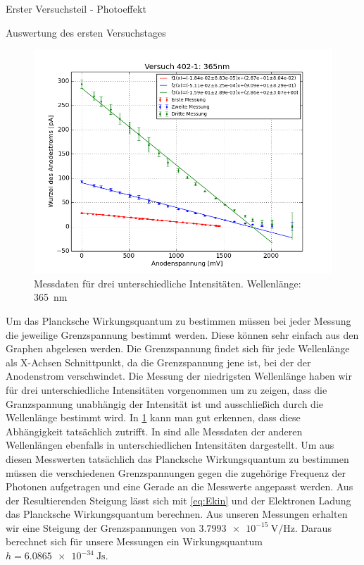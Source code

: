 \documentclass[pdftex, a4paper,11pt, twoside, ngerman]{report}
\begin{document}
\begin{chapter}{Erster Versuchsteil - Photoeffekt}
    \begin{section}{Auswertung des ersten Versuchstages}
      \label{chp:Photoeffekt:sec:Auswertung}
      \begin{figure}[b!]
        \begin{center}
          \includegraphics[width=\textwidth]{Figures/Versuch402_1_365.png}
          \caption{Messdaten für drei unterschiedliche Intensitäten. Wellenlänge: \SI{365}{\nano\meter}}\label{fig:Versuch402_1_365}
        \end{center}
      \end{figure}
      Um das Plancksche Wirkungsquantum zu bestimmen müssen bei jeder Messung die jeweilige Grenzspannung bestimmt werden. Diese können sehr einfach aus den Graphen abgelesen werden. Die Grenzspannung findet sich für jede Wellenlänge als X-Achsen Schnittpunkt, da die Grenzspannung jene ist, bei der der Anodenstrom verschwindet. Die Messung der niedrigsten Wellenlänge haben wir für drei unterschiedliche Intensitäten vorgenommen um zu zeigen, dass die Granzspannung unabhängig der Intensität ist und ausschließich durch die Wellenlänge bestimmt wird. In \cref{fig:Versuch402_1_365} kann man gut erkennen, dass diese Abhängigkeit tatsächlich zutrifft. In  sind alle Messdaten der anderen Wellenlängen ebenfalls in unterschiedlichen Intensitäten dargestellt. Um aus diesen Messwerten tatsächlich das Plancksche Wirkungsquantum zu bestimmen müssen die verschiedenen Grenzspannungen gegen die zugehörige Frequenz der Photonen aufgetragen und eine Gerade an die Messwerte angepasst werden. Aus der Resultierenden Steigung lässt sich mit \cref{eq:Ekin} und der Elektronen Ladung das Plancksche Wirkungsquantum berechnen. Aus unseren Messungen erhalten wir eine Steigung der Grenzspannungen von $\SI{3.7993e-15}{\volt\per\hertz}$. Daraus berechnet sich für unsere Messungen ein Wirkungsquantum $h=\SI{6.0865e-34}{\joule\second}$. 
      

\end{section}
\end{chapter}
\end{document}
